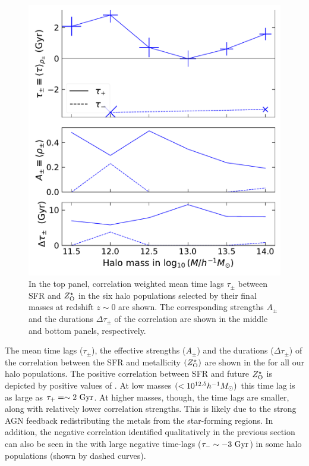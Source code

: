 \begin{figure}[htbp]
\centering
\includegraphics[width=.49\linewidth]{plots/dynam_relxn/shift_betw_SFR-Z(O)_SFreg_fullcorr.pdf}
\caption{In the top panel, correlation weighted mean time lags $\tau_{\pm}$ between SFR and $Z^{\star}_{\rm{O}}$ in the six halo populations selected by their final masses at redshift $z\sim 0$ are shown. The corresponding strengths $A_{\pm}$ and the durations $\Delta \tau_{\pm}$ of the correlation are shown in the middle and bottom panels, respectively.}
\label{fig:dynam-correl-sfr-ZOsfr-timeshift-all}
\end{figure}

The mean time lags ($\tau_{\pm}$), the effective strengths ($A_{\pm}$) and the durations ($\Delta\tau_{\pm}$) of the correlation between the SFR and metallicity $(Z^{\star}_{\rm{O}})$ are shown in the  for all our halo populations. 
The positive correlation between SFR and future $Z^{\star}_{\rm{O}}$ is depicted by positive values of . At low masses $(<10^{12.5}h^{-1}M_{\odot})$ this time lag is as large as $\tau_{+}=\sim 2 ~\rm{Gyr}$. At higher masses, though, the time lags are smaller, along with relatively lower correlation strengths. This is likely due to the strong AGN feedback redistributing the metals from the star-forming regions. In addition, the negative correlation identified qualitatively in the previous section can also be seen in the  with large negative time-lags ($\tau_{-} \sim -3~ \rm{Gyr}$) in some halo populations (shown by dashed curves).


